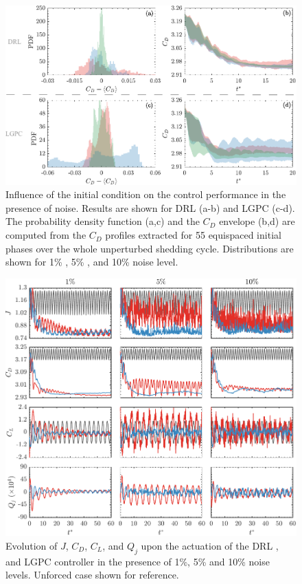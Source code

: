 \begin{figure}[t]
    \centering
    \includegraphics[width=0.99\linewidth]{Figures/6.pdf}
    \caption{Influence of the initial condition on the control performance in the presence of noise. Results are shown for DRL (a-b) and LGPC (c-d). The probability density function (a,c) and the $C_D$ envelope (b,d) are computed from the $C_D$ profiles extracted for 55 equispaced initial phases over the whole unperturbed shedding cycle. Distributions are shown for 1\% , 5\% , and 10\%  noise level.}
    \label{fig:Noise_rIC_pdf}
\end{figure}


\begin{figure}[t]
    \centering
    \includegraphics[width=0.95\linewidth]{Figures/7.pdf}
    \caption{Evolution of $J$, $C_D$, $C_L$, and $Q_j$ upon the actuation of the DRL , and LGPC  controller in the presence of  1\%, 5\% and 10\% noise levels. Unforced case  shown for reference.}
    \label{fig:Noise_rIC_history}
\end{figure}

